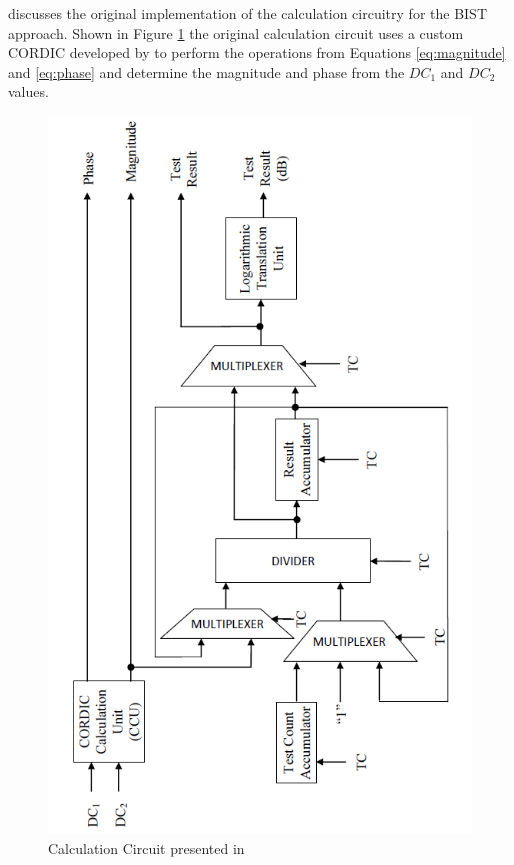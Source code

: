 \documentclass[12pt]{report}
\begin{document}
\cite{joey} discusses the original implementation of the calculation circuitry for the BIST approach.  Shown in Figure \ref{fig:joeycalc} the original calculation circuit uses a custom CORDIC developed by \cite{joey} to perform the operations from Equations \ref{eq:magnitude} and \ref{eq:phase} and determine the magnitude and phase from the $DC_1$ and $DC_2$ values.
\begin{figure}
	\begin{center}
		\includegraphics[scale=1]{images/joey-calculation}
	\end{center}
	\caption{Calculation Circuit presented in \cite{joey}}
	\label{fig:joeycalc}
\end{figure}
\end{document}
